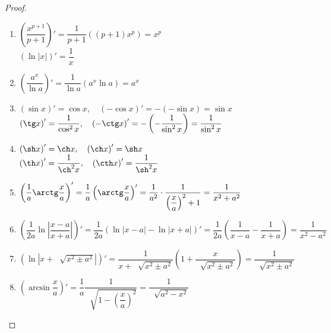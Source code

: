 \documentclass[../main.tex]{subfiles}
\begin{document}
\begin{proof}

    ~

    \begin{enumerate}
        \item \( \left(\dfrac{ x^{p+1}}{ p+1}\right)'= \dfrac{ 1}{ p+1} \left( \left( p+1\right)x^p\right)=x^p \)\\ 
        \( \left( \ln \left| x\right|\right)'= \dfrac{ 1}{ x} \)
        \item \( \left( \dfrac{ a^x}{ \ln a} \right)'= \dfrac{ 1}{ \ln a} \left( a^x \ln a\right)=a^x\)
        \item \( \left( \sin x\right)' = \cos x,\quad \left( -\cos x\right)'=-(-\sin x)=\sin x\)\\ 
        \( \left( \tg x\right)'= \dfrac{ 1}{ \cos ^2x},\quad \left( -\ctg x\right)'=-\left( -\dfrac{ 1}{ \sin^2x} \right)= \dfrac{ 1}{ \sin^2x}\)
        \item \( \left( \sh x\right)' = \ch x,\quad \left( \ch x\right)' = \sh x\)\\ 
        \( \left( \th x\right)'= \dfrac{ 1}{ \ch^2 x},\quad \left( \cth x\right)' = \dfrac{ 1}{ \sh^2x}  \)
        \item \( \left( \dfrac{ 1}{ a} \arctg \dfrac{ x}{ a} \right)'= \dfrac{ 1}{ a} \left( \arctg \dfrac{ x}{ a} \right)'= \dfrac{ 1}{ a^2} \cdot  \dfrac{ 1}{ \left( \dfrac{ x}{ a} \right)^2+1} = \dfrac{ 1}{ x^2+a^2}\)
        \item \( \left(\dfrac{ 1}{ 2a} \ln \left| \dfrac{ x-a}{ x+a} \right|\right)'= \dfrac{ 1}{ 2a} \left( \ln \left| x-a\right|- \ln \left| x+a\right|\right)'= \dfrac{ 1}{ 2a} \left( \dfrac{ 1}{ x-a} - \dfrac{ 1}{ x+a} \right)= \dfrac{ 1}{ x^2-a^2} \)
        \item \( \left( \ln \left| x+ \;\sqrt[]{x^2 \pm a^2}\right|\right)'= \dfrac{ 1}{ x+ \;\sqrt[]{x^2\pm a^2}} \left( 1+ \dfrac{ x}{ \;\sqrt[]{x^2\pm a^2}}\right)= \dfrac{ 1}{ \;\sqrt[]{x^2\pm a^2}} \)
        \item \( \left( \arcsin \dfrac{ x}{ a}\right)'= \dfrac{ 1}{ a} \dfrac{ 1}{ \;\sqrt[]{1- \left( \dfrac{ x}{ a} \right)^2}} = \dfrac{ 1}{ \;\sqrt[]{a^2-x^2}} \)
    \end{enumerate}
\end{proof}
\end{document}
